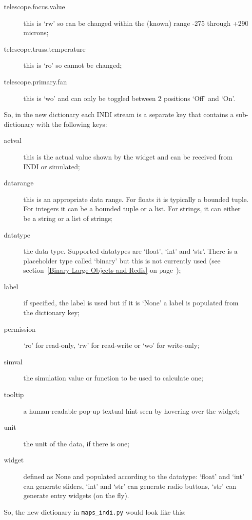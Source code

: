 \documentclass[12pt,twoside]{article}
\begin{document}
\begin{description}
 \item[telescope.focus.value] this is `rw' so can be changed within the (known) range -275 through +290 microns;
 \item[telescope.truss.temperature] this is `ro' so cannot be changed;
 \item[telescope.primary.fan] this is `wo' and can only be toggled between 2 positions `Off' and `On'.
\end{description}

So, in the new dictionary each INDI stream is a separate key that contains a sub-dictionary with the following keys:

\begin{description}
 \item[actval] this is the actual value shown by the widget and can be received from INDI or simulated;
 \item[datarange] this is an appropriate data range. For floats it is typically a bounded tuple. For integers it can
    be a bounded tuple or a list. For strings, it can either be a string or a list of strings;
 \item[datatype] the data type. Supported datatypes are `float', `int' and `str'. There is a placeholder type called `binary'
    but this is not currently used (see section~\ref{Binary Large Objects and Redis} on page~\pageref{Binary Large Objects and Redis});
 \item[label] if specified, the label is used but if it is `None' a label is populated from the dictionary key;
 \item[permission] `ro' for read-only, `rw' for read-write or `wo' for write-only;
 \item[simval] the simulation value or function to be used to calculate one;
 \item[tooltip] a human-readable pop-up textual hint seen by hovering over the widget;
 \item[unit] the unit of the data, if there is one;
 \item[widget] defined as None and populated according to the datatype: `float' and `int' can generate sliders, `int' and `str' can
    generate radio buttons, `str' can generate entry widgets (on the fly).
\end{description}

So, the new dictionary in {\tt maps\_indi.py} would look like this:
\end{document}
